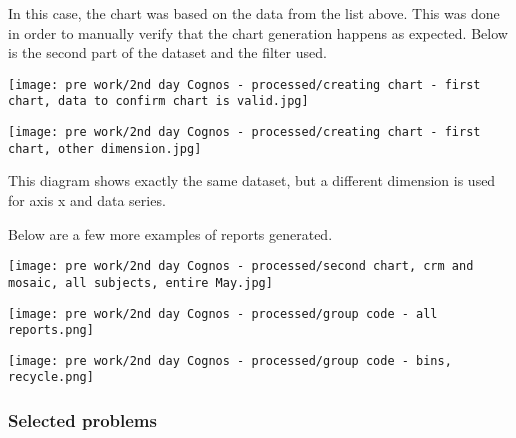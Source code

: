 In this case, the chart was based on the data from the list above. This was done in order to manually verify that the chart generation happens as expected. Below is the second part of the dataset and the filter used.

\begin{center}
  \texttt{[image: pre work/2nd day Cognos - processed/creating chart - first chart, data to confirm chart is valid.jpg]}
  \label{normal_case}
\end{center}


\begin{center}
  \texttt{[image: pre work/2nd day Cognos - processed/creating chart - first chart, other dimension.jpg]}
  \label{normal_case}
\end{center}


This diagram shows exactly the same dataset, but a different dimension is used for axis x and data series.

Below are a few more examples of reports generated.


\begin{center}
  \texttt{[image: pre work/2nd day Cognos - processed/second chart, crm and mosaic, all subjects, entire May.jpg]}
  \label{normal_case}
\end{center}


\begin{center}
  \texttt{[image: pre work/2nd day Cognos - processed/group code - all reports.png]}
  \label{normal_case}
\end{center}



\begin{center}
  \texttt{[image: pre work/2nd day Cognos - processed/group code - bins, recycle.png]}
  \label{normal_case}
\end{center}



			\subsubsection{Selected problems}
			
